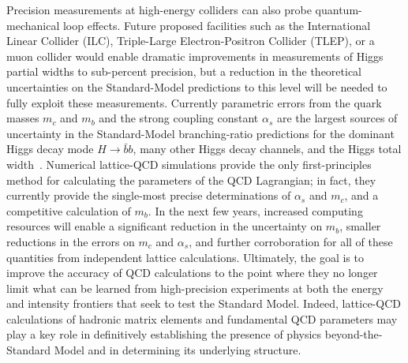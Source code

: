 Precision measurements at high-energy colliders can also probe quantum-mechanical loop effects.  Future proposed facilities such as the International Linear Collider (ILC), Triple-Large Electron-Positron Collider (TLEP), or a muon collider would enable dramatic improvements in measurements of Higgs partial widths to sub-percent precision, but a reduction in the theoretical uncertainties on the Standard-Model predictions to this level will be needed to fully exploit these measurements.  Currently parametric errors from the quark masses $m_c$ and $m_b$ and the strong coupling constant $\alpha_s$ are the largest sources of uncertainty in the Standard-Model branching-ratio predictions for the dominant Higgs decay mode $H \to \bar{b}b$, many other Higgs decay channels, and the Higgs total width~\cite{Denner:2011mq}.  Numerical lattice-QCD simulations provide the only first-principles method for calculating the parameters of the QCD Lagrangian; in fact, they currently provide the single-most precise determinations of $\alpha_s$ and $m_c$, and a competitive calculation of $m_b$.  In the next few years, increased computing resources will enable a significant reduction in the uncertainty on $m_b$, smaller reductions in the errors on $m_c$ and $\alpha_s$, and further corroboration for all of these quantities from independent lattice calculations.  Ultimately, the goal is to improve the accuracy of QCD calculations to the point where they no longer limit what can be learned from high-precision experiments at both the energy and intensity frontiers that seek to test the Standard Model.  Indeed, lattice-QCD calculations of hadronic matrix elements and fundamental QCD parameters may play a key role in definitively establishing the presence of physics beyond-the-Standard Model and in determining its underlying structure.

